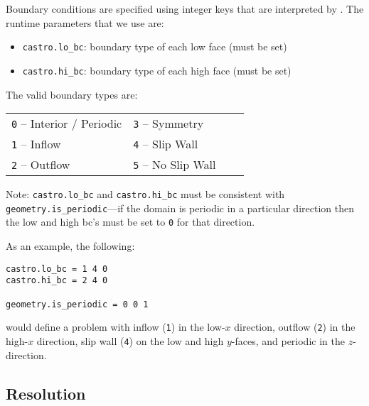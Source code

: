 Boundary conditions are specified using integer keys that are interpreted
by \boxlib.  The runtime parameters that we use are:
\begin{itemize}
\item {\tt castro.lo\_bc}: boundary type of each low face  (must be set)
\item {\tt castro.hi\_bc}: boundary type of each high face (must be set)
\end{itemize}

The valid boundary types are:
\begin{table*}[h]
\begin{center}
\begin{tabular}{llll} 
{\tt 0} --  Interior / Periodic \hspace{1.in} & {\tt 3}  --  Symmetry     \hspace{1.in} & \\
{\tt 1} --  Inflow              \hspace{1.in} & {\tt 4}  --  Slip Wall    \hspace{1.in}& \\
{\tt 2} --  Outflow             \hspace{1.in} & {\tt 5}  --  No Slip Wall \hspace{1.in}& \\
\end{tabular}
\end{center}
\end{table*}

\noindent Note: {\tt castro.lo\_bc} and {\tt castro.hi\_bc} must be consistent with 
{\tt geometry.is\_periodic}---if the domain is periodic in a particular
direction then the low and high bc's must be set to {\tt 0} for that direction.

As an example, the following:
\begin{lstlisting}
castro.lo_bc = 1 4 0 
castro.hi_bc = 2 4 0 

geometry.is_periodic = 0 0 1
\end{lstlisting}
would define a problem with inflow ({\tt 1}) in the low-$x$ direction,
outflow ({\tt 2}) in the high-$x$ direction, slip wall ({\tt 4}) on
the low and high $y$-faces, and periodic in the $z$-direction.

\subsection{Resolution}

